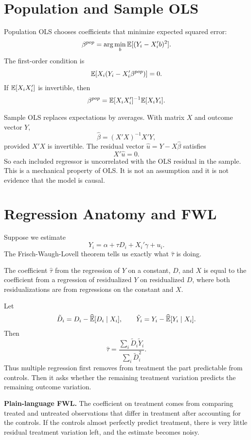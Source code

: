 \section{Population and Sample OLS}

Population OLS chooses coefficients that minimize expected squared error:
\[
  \beta^{pop}
  =
  \arg\min_b \mathbb{E}[(Y_i-X_i'b)^2].
\]
The first-order condition is
\[
  \mathbb{E}[X_i(Y_i-X_i'\beta^{pop})]=0.
\]
If $\mathbb{E}[X_iX_i']$ is invertible, then
\[
  \beta^{pop}=\mathbb{E}[X_iX_i']^{-1}\mathbb{E}[X_iY_i].
\]

Sample OLS replaces expectations by averages. With matrix $X$ and outcome
vector $Y$,
\[
  \hat\beta = (X'X)^{-1}X'Y,
\]
provided $X'X$ is invertible. The residual vector $\hat u=Y-X\hat\beta$
satisfies
\[
  X'\hat u=0.
\]
So each included regressor is uncorrelated with the OLS residual in the sample.
This is a mechanical property of OLS. It is not an assumption and it is not
evidence that the model is causal.

\section{Regression Anatomy and FWL}

Suppose we estimate
\[
  Y_i=\alpha+\tau D_i+X_i'\gamma+u_i.
\]
The Frisch-Waugh-Lovell theorem tells us exactly what $\hat\tau$ is doing.

\begin{thmN}
The coefficient $\hat\tau$ from the regression of $Y$ on a constant, $D$, and
$X$ is equal to the coefficient from a regression of residualized $Y$ on
residualized $D$, where both residualizations are from regressions on the
constant and $X$.
\end{thmN}

Let
\[
  \tilde D_i = D_i-\widehat{\mathbb{E}}[D_i\mid X_i],
  \qquad
  \tilde Y_i = Y_i-\widehat{\mathbb{E}}[Y_i\mid X_i].
\]
Then
\[
  \hat\tau
  =
  \frac{\sum_i \tilde D_i\tilde Y_i}{\sum_i \tilde D_i^2}.
\]
Thus multiple regression first removes from treatment the part predictable
from controls. Then it asks whether the remaining treatment variation predicts
the remaining outcome variation.

\begin{boxD}
\textbf{Plain-language FWL.} The coefficient on treatment comes from comparing
treated and untreated observations that differ in treatment after accounting
for the controls. If the controls almost perfectly predict treatment, there is
very little residual treatment variation left, and the estimate becomes noisy.
\end{boxD}


